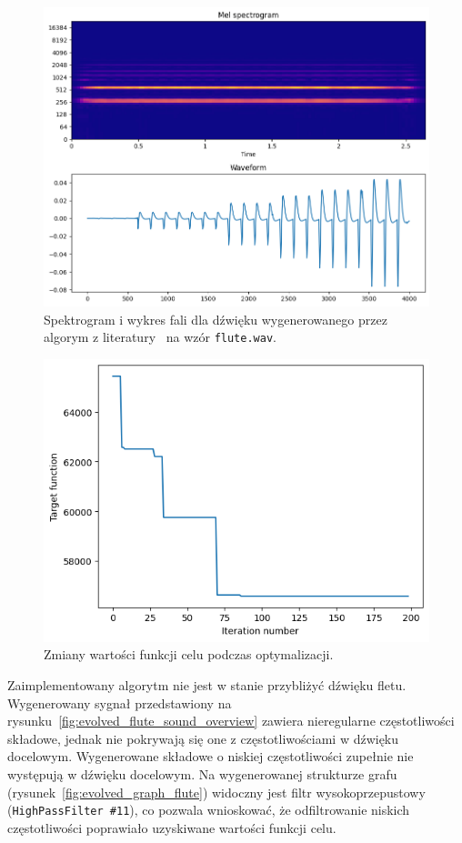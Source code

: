 \begin{figure}[H]
    \centering
    \includegraphics[width=0.7\linewidth]{rys06/macret_evolved_flute.png}
    \caption{
      Spektrogram i wykres fali dla dźwięku
      wygenerowanego przez algorym z literatury~\cite{evolutionary_puredata}
      na wzór \texttt{flute.wav}.
    }\label{fig:evolved_literature_flute}
\end{figure}

\begin{figure}[H]
    \centering
    \includegraphics[width=0.6\linewidth]{rys06/flute_target_fun_values.png}
    \caption{
      Zmiany wartości funkcji celu podczas optymalizacji.
    }%
\end{figure}


Zaimplementowany algorytm nie jest w stanie przybliżyć dźwięku fletu.
Wygenerowany sygnał przedstawiony na rysunku~\ref{fig:evolved_flute_sound_overview}
zawiera nieregularne częstotliwości składowe,
jednak nie pokrywają się one z częstotliwościami w dźwięku docelowym.
Wygenerowane składowe o niskiej częstotliwości zupełnie nie występują w dźwięku docelowym.
Na wygenerowanej strukturze grafu (rysunek~\ref{fig:evolved_graph_flute}) widoczny
jest filtr wysokoprzepustowy (\texttt{HighPassFilter \#11}), co pozwala wnioskować,
że odfiltrowanie niskich częstotliwości poprawiało uzyskiwane wartości funkcji celu.

